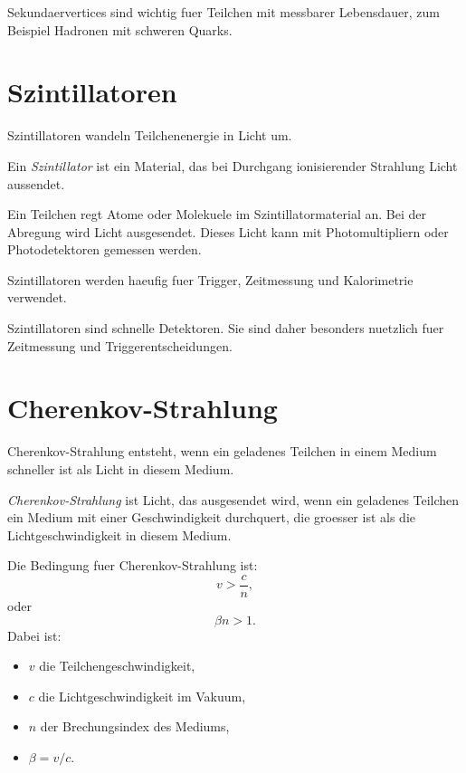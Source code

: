 \begin{examtipbox}
Sekundaervertices sind wichtig fuer Teilchen mit messbarer Lebensdauer,
zum Beispiel Hadronen mit schweren Quarks.
\end{examtipbox}

\section{Szintillatoren}

Szintillatoren wandeln Teilchenenergie in Licht um.

\begin{definitionbox}
Ein \emph{Szintillator} ist ein Material, das bei Durchgang ionisierender Strahlung
Licht aussendet.
\end{definitionbox}

\begin{conceptbox}
Ein Teilchen regt Atome oder Molekuele im Szintillatormaterial an.
Bei der Abregung wird Licht ausgesendet.
Dieses Licht kann mit Photomultipliern oder Photodetektoren gemessen werden.
\end{conceptbox}

\begin{notebox}
Szintillatoren werden haeufig fuer Trigger, Zeitmessung und Kalorimetrie verwendet.
\end{notebox}

\begin{examtipbox}
Szintillatoren sind schnelle Detektoren.
Sie sind daher besonders nuetzlich fuer Zeitmessung und Triggerentscheidungen.
\end{examtipbox}

\section{Cherenkov-Strahlung}

Cherenkov-Strahlung entsteht, wenn ein geladenes Teilchen in einem Medium schneller
ist als Licht in diesem Medium.

\begin{definitionbox}
\emph{Cherenkov-Strahlung} ist Licht, das ausgesendet wird, wenn ein geladenes
Teilchen ein Medium mit einer Geschwindigkeit durchquert, die groesser ist als die
Lichtgeschwindigkeit in diesem Medium.
\end{definitionbox}

\begin{formulabox}
Die Bedingung fuer Cherenkov-Strahlung ist:
\[
    v > \frac{c}{n},
\]
oder
\[
    \beta n > 1.
\]
Dabei ist:
\begin{itemize}
    \item $v$ die Teilchengeschwindigkeit,
    \item $c$ die Lichtgeschwindigkeit im Vakuum,
    \item $n$ der Brechungsindex des Mediums,
    \item $\beta=v/c$.
\end{itemize}
\end{formulabox}

